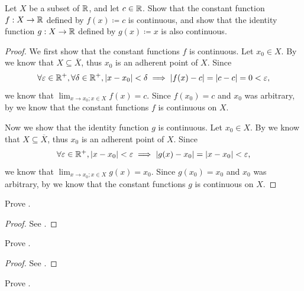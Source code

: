 \begin{ex}\label{i:ex:9.4.2}
  Let \(X\) be a subset of \(\mathbb{R}\), and let \(c \in \mathbb{R}\).
  Show that the constant function \(f : X \to \mathbb{R}\) defined by \(f(x) \coloneqq c\) is continuous, and show that the identity function \(g : X \to \mathbb{R}\) defined by \(g(x) \coloneqq x\) is also continuous.
\end{ex}

\begin{proof}
  We first show that the constant functions \(f\) is continuous.
  Let \(x_0 \in X\).
  By  we know that \(X \subseteq \overline{X}\), thus \(x_0\) is an adherent point of \(X\).
  Since
  \[
    \forall \varepsilon \in \mathbb{R}^+, \forall \delta \in \mathbb{R}^+, \left\lvert x - x_0\right\rvert < \delta \implies \left\lvert f(x) - c\right\rvert = \left\lvert c - c\right\rvert = 0 < \varepsilon,
  \]
  we know that \(\lim_{x \to x_0 ; x \in X} f(x) = c\).
  Since \(f(x_0) = c\) and \(x_0\) was arbitrary, by  we know that the constant functions \(f\) is continuous on \(X\).

  Now we show that the identity function \(g\) is continuous.
  Let \(x_0 \in X\).
  By  we know that \(X \subseteq \overline{X}\), thus \(x_0\) is an adherent point of \(X\).
  Since
  \[
    \forall \varepsilon \in \mathbb{R}^+, \left\lvert x - x_0\right\rvert < \varepsilon \implies \left\lvert g(x) - x_0\right\rvert = \left\lvert x - x_0\right\rvert < \varepsilon,
  \]
  we know that \(\lim_{x \to x_0 ; x \in X} g(x) = x_0\).
  Since \(g(x_0) = x_0\) and \(x_0\) was arbitrary, by  we know that the constant functions \(g\) is continuous on \(X\).
\end{proof}

\begin{ex}\label{i:ex:9.4.3}
  Prove .
\end{ex}

\begin{proof}
  See .
\end{proof}

\begin{ex}\label{i:ex:9.4.4}
  Prove .
\end{ex}

\begin{proof}
  See .
\end{proof}

\begin{ex}\label{i:ex:9.4.5}
  Prove .
\end{ex}


